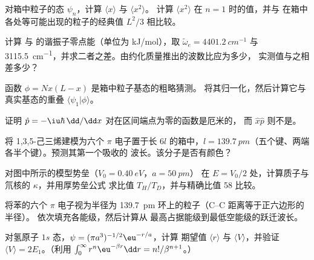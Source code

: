 \begin{exercise}[$\star\star$]\label{exo:b3:quantum-model-systems:5}
对箱中粒子的态 $\psi_n$，计算 $\langle x\rangle$ 与 $\langle x^2\rangle$。
计算 $\langle x^2\rangle$ 在 $n = 1$ 时的值，并与
在箱中各处等可能出现的粒子的经典值 $L^2/3$ 相比较。
\end{exercise}

\begin{exercise}[$\star\star$]\label{exo:b3:quantum-model-systems:6}
计算  与  的谐振子零点能（单位为
\unit{kJ/mol}），取 $\tilde\omega_e = \qty{4401.2}{cm^{-1}}$ 与
\qty{3115.5}{cm^{-1}}，并求二者之差。由约化质量推出的波数比应为多少，
实测值与之相差多少？
\end{exercise}

\begin{exercise}[$\star\star$]\label{exo:b3:quantum-model-systems:7}
函数 $\phi = Nx(L - x)$ 是箱中粒子基态的粗略猜测。
将其归一化，然后计算它与
真实基态的重叠 $\langle\psi_1|\phi\rangle$。
\end{exercise}

\begin{exercise}[$\star\star$]\label{exo:b3:quantum-model-systems:8}
证明 $\hat p = -\iu\hbar\,\dd/\dd x$ 对在区间端点为零的函数是厄米的，
而 $\hat x\hat p$ 则不是。
\end{exercise}

\begin{exercise}[$\star\star$]\label{exo:b3:quantum-model-systems:9}
将 1,3,5-己三烯建模为六个 $\pi$ 电子置于长 $6l$ 的箱中，$l =
\qty{139.7}{pm}$（五个键、两端各半个键）。预测其第一个吸收的
波长。该分子是否有颜色？
\end{exercise}

\begin{exercise}[$\star\star\star$]\label{exo:b3:quantum-model-systems:10}
对图中所示的模型势垒（$V_0 = \qty{0.40}{eV}$，$a = \qty{50}{pm}$）
在 $E = V_0/2$ 处，计算质子与氘核的 $\kappa$，并用厚势垒公式
求比值 $T_H/T_D$，并与精确比值 58 比较。
\end{exercise}

\begin{exercise}[$\star\star\star$]\label{exo:b3:quantum-model-systems:11}
将苯的六个 $\pi$ 电子视为半径为
\qty{139.7}{pm} 环上的粒子（C--C 距离等于正六边形的半径）。
依次填充各能级，然后计算从
最高占据能级到最低空能级的跃迁波长。
\end{exercise}

\begin{exercise}[$\star\star\star$]\label{exo:b3:quantum-model-systems:12}
对氢原子 $1s$ 态，$\psi = (\pi a^3)^{-1/2}\eu^{-r/a}$，计算
期望值 $\langle r\rangle$ 与 $\langle V\rangle$，并验证
$\langle V\rangle = 2E_1$。（利用 $\int_0^\infty r^n\eu^{-\beta r}\dd r =
n!/\beta^{n+1}$。）
\end{exercise}

